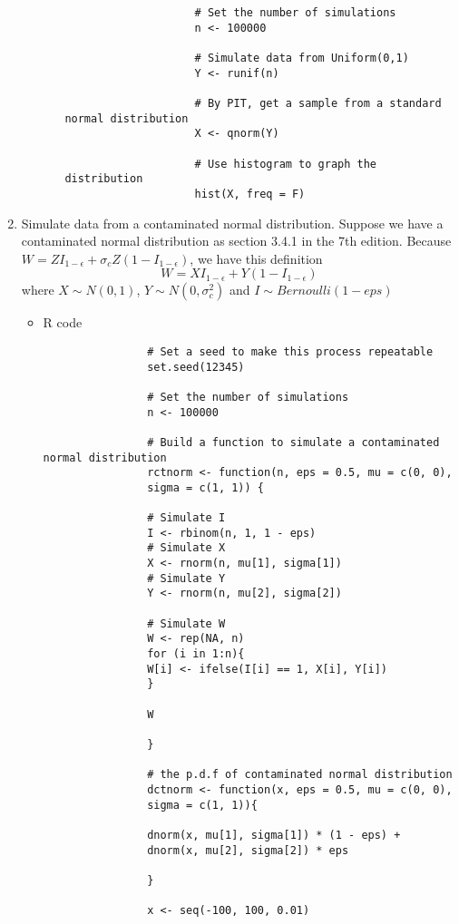 \begin{enumerate}
\begin{enumerate}
\begin{itemize}
\begin{verbatim}
					# Set the number of simulations
					n <- 100000
					
					# Simulate data from Uniform(0,1)
					Y <- runif(n)
					
					# By PIT, get a sample from a standard normal distribution
					X <- qnorm(Y)
					
					# Use histogram to graph the distribution
					hist(X, freq = F)
					\end{verbatim}
				\end{itemize}
				
		\end{enumerate}
	\item Simulate data from a contaminated normal distribution. Suppose we have a contaminated normal distribution as section 3.4.1 in the 7th edition. Because $W = ZI_{1-\epsilon} + \sigma_c Z (1 - I_{1 - \epsilon})$, we have this definition
		\begin{equation*}
			W = XI_{1-\epsilon} + Y (1 - I_{1 - \epsilon})
		\end{equation*}
	where $X \sim N(0,1)$, $Y \sim N(0, \sigma_c^2)$ and $I \sim Bernoulli(1 - eps)$
		\begin{itemize}
			\item R code
			\begin{verbatim}
				# Set a seed to make this process repeatable
				set.seed(12345) 
				
				# Set the number of simulations
				n <- 100000
				
				# Build a function to simulate a contaminated normal distribution
				rctnorm <- function(n, eps = 0.5, mu = c(0, 0), 
				sigma = c(1, 1)) {
				
				# Simulate I
				I <- rbinom(n, 1, 1 - eps)
				# Simulate X
				X <- rnorm(n, mu[1], sigma[1])
				# Simulate Y
				Y <- rnorm(n, mu[2], sigma[2])
				
				# Simulate W
				W <- rep(NA, n)
				for (i in 1:n){
				W[i] <- ifelse(I[i] == 1, X[i], Y[i])
				}
				
				W
				
				}
				
				# the p.d.f of contaminated normal distribution
				dctnorm <- function(x, eps = 0.5, mu = c(0, 0), 
				sigma = c(1, 1)){
				
				dnorm(x, mu[1], sigma[1]) * (1 - eps) + 
				dnorm(x, mu[2], sigma[2]) * eps
				
				}
				
				x <- seq(-100, 100, 0.01)
				

\end{verbatim}
\end{itemize}
\end{enumerate}
